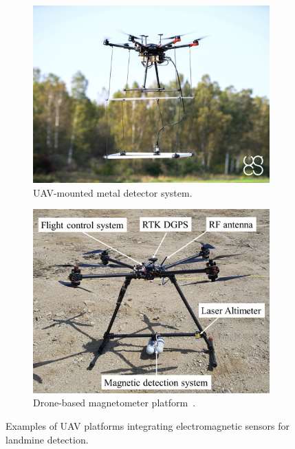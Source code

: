 \begin{figure}[h!]
    \centering
    \begin{subfigure}[b]{0.48\linewidth}
        \centering
        \includegraphics[width=\linewidth]{figs/Huirui/metal_detector_drone.png}
        \caption{UAV-mounted metal detector system\protect\footnotemark.}
        \label{fig:metal_detector_drone}
    \end{subfigure}
    \hfill
    \begin{subfigure}[b]{0.48\linewidth}
        \centering
        \includegraphics[width=\linewidth]{figs/Huirui/magnetometer_drone.png}
        \caption{Drone-based magnetometer platform~\cite{yoo2020drone}.}
        \label{fig:magnetometer_drone}
    \end{subfigure}
    \caption{Examples of UAV platforms integrating electromagnetic sensors for landmine detection.}
    \label{fig:emi_uav_examples}
\end{figure}

